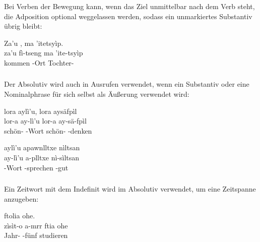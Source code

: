 \subsubsection{} Bei Verben der Bewegung kann, wenn das Ziel unmittelbar nach dem Verb steht, die Adposition  optional weggelassen werden, sodass ein unmarkiertes Substantiv übrig bleibt:\label{syn:subjective:ne}

\begin{interlin}
	\glll \Npawl{}Za'u , ma 'itetsyìp. \\
	za'u fì-tseng ma 'ite-tsyìp \\
	kommen -Ort  Tochter- \\
\end{interlin}

\subsubsection{} Der Absolutiv wird auch in Ausrufen verwendet, wenn ein Substantiv oder eine Nominalphrase für sich selbst als Äußerung verwendet wird:

\begin{interlin}
	\glll \Npawl{}lora aylì'u, lora aysäfpìl \\
	lor-a ay-lì'u lor-a ay-sä-fpìl \\
	schön- -Wort schön- -denken \\
\end{interlin}

\begin{interlin}
	\glll \Npawl{}aylì'u apawnlltxe nìltsan \\
	ay-lì'u a-plltxe nì-sìltsan \\
	-Wort -sprechen -gut \\
\end{interlin}

\subsubsection{} Ein Zeitwort mit dem Indefinit  wird im Absolutiv verwendet, um eine Zeitspanne anzugeben:

\begin{interlin}
	\glll \Nfilm{}  ftolia ohe. \\
	zìsìt-o a-mrr ftia ohe \\
	Jahr- -fünf studieren  \\
\end{interlin}

